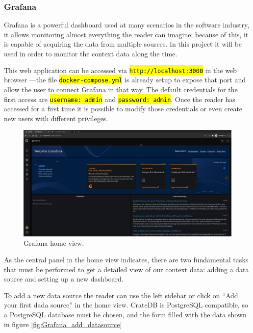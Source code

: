 \documentclass[11pt,a4paper,dvipsnames,twoside]{article}
\newcommand{\cmd}[1] {\hl{\texttt{#1}}}
\begin{document}
\subsubsection{Grafana}\label{sssec:Grafana}
Grafana is a powerful dashboard used at many scenarios in the software industry, it allows monitoring almost everything the reader can imagine; because of this, it is capable of acquiring the data from multiple sources. In this project it will be used in order to monitor the context data along the time.

This web application can be accessed via \cmd{http://localhost:3000} in the web browser ---the file \cmd{docker-compose.yml} is already setup to expose that port and allow the user to connect Grafana in that way. The default credentials for the first access are \cmd{username: admin} and \cmd{password: admin}. Once the reader has accessed for a first time it is possible to modify those credentials or even create new users with different privileges.

\begin{figure}[ht]
  \centering
  \includegraphics[width=.9\textwidth]{../pictures/Grafana_home.png}
  \caption{Grafana home view.}
  \label{fig:grafana_home}
\end{figure}

As the central panel in the home view indicates, there are two fundamental tasks that must be performed to get a detailed view of our context data: adding a data source and setting up a new dashboard.

To add a new data source the reader can use the left sidebar or click on \enquote{Add your first dada source} in the home view. CrateDB is PostgreSQL compatible, so a PostgreSQL database must be chosen, and the form filled with the data shown in figure \ref{fig:Grafana_add_datasource}
\end{document}
